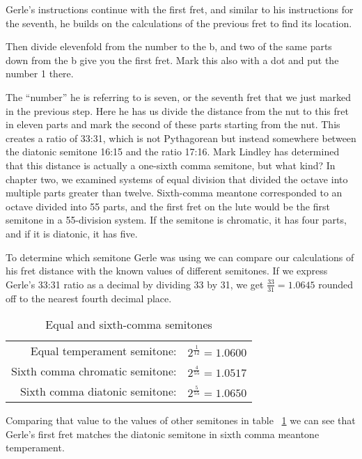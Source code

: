 Gerle's instructions continue with the first fret, and similar to his instructions for the
seventh, he builds on the calculations of the previous fret to find its location.
\begin{blocks}
Then divide elevenfold from the number to the b, and two of the same parts down from the b
give you the first fret.  Mark this also with a dot and put the number 1 there.
\end{blocks}
The ``number'' he is referring to is seven, or the seventh fret that we just marked in the
previous step.  Here he has us divide the distance from the nut to this fret in eleven
parts and mark the second of these parts starting from the nut. This creates a ratio of
33:31, which is not Pythagorean but instead somewhere between the diatonic semitone
16:15 and the ratio 17:16. Mark Lindley has determined that this distance is actually a
one-sixth comma semitone, but what kind?  In chapter two, we examined systems of equal
division that divided the octave into multiple parts greater than twelve.  Sixth-comma
meantone corresponded to an octave divided into 55 parts, and the first fret on the lute
would be the first semitone in a 55-division system.  If the semitone is chromatic, 
it has four parts, and if it is diatonic, it has five.

To determine which semitone Gerle was using we can compare our calculations of his fret
distance with the known values of different semitones.  If we express Gerle's 33:31 ratio
as a decimal by dividing 33 by 31, we get $ \frac{33}{31} = 1.0645 $ rounded off
to the nearest fourth decimal place.
\begin{table}[h!]
    \begin{center}
    \begin{tabular}{ r l }
        Equal temperament semitone:     & $ 2^\frac{1}{12} = 1.0600 $ \\
        Sixth comma chromatic semitone: & $ 2^\frac{4}{55} = 1.0517 $ \\
        Sixth comma diatonic semitone:  & $ 2^\frac{5}{55} = 1.0650 $ \\
    \end{tabular}
    \end{center}
    \caption{Equal and sixth-comma semitones}
    \label{table:6semitones}
\end{table}
Comparing that value to the values of other semitones in table ~\ref{table:6semitones}
we can see that Gerle's first fret matches the diatonic semitone in sixth comma
meantone temperament.

